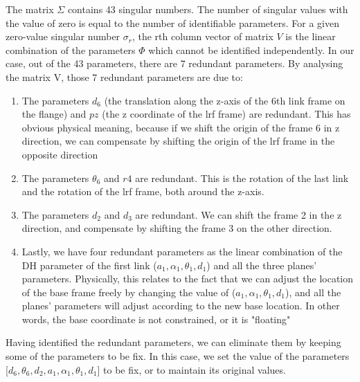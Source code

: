 The matrix ${\Sigma}$ contains 43 singular numbers. The number of singular values with the value of zero is equal to the number of identifiable parameters. For a given zero-value singular number $\sigma_r$, the rth column vector of matrix $V$ is the linear combination of the parameters $\Phi$ which cannot be identified independently. 
In our case, out of the 43 parameters, there are 7 redundant parameters. By analysing the matrix V, those 7 redundant parameters are due to:
\begin{enumerate}
\item The parameters $d_6$ (the translation along the z-axis of the 6th link frame on the flange) and $pz$ (the z coordinate of the \ac{lrf} frame) are redundant. This has obvious physical meaning, because if we shift the origin of the frame 6 in z direction, we can compensate by shifting the origin of the \ac{lrf} frame in the opposite direction
\item The parameters $\theta_6$ and $r4$ are redundant. This is the rotation of the last link and the rotation of the \ac{lrf} frame, both around the z-axis. 
\item The parameters $d_2$ and $d_3$ are redundant. We can shift the frame 2 in the z direction, and compensate by shifting the frame 3 on the other direction. 
\item Lastly, we have four redundant parameters as the linear combination of the DH parameter of the first link ($a_1, \alpha_1, \theta_1, d_1$) and all the three planes' parameters. Physically, this relates to the fact that we can adjust the location of the base frame freely by changing the value of ($a_1, \alpha_1, \theta_1, d_1$), and all the planes' parameters will adjust according to the new base location. In other words, the base coordinate is not constrained, or it is "floating"
\end{enumerate}

Having identified the redundant parameters, we can eliminate them by keeping some of the parameters to be fix. In this case, we set the value of the parameters [$d_6, \theta_6, d_2, a_1, \alpha_1, \theta_1, d_1$] to be fix, or to maintain its original values. 
